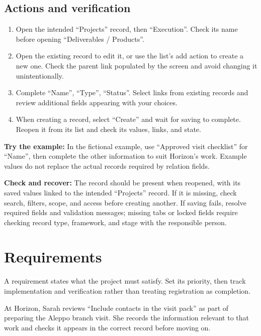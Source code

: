 \subsection{Actions and verification}
\begin{enumerate}
\item Open the intended “Projects” record, then “Execution”. Check its name before opening “Deliverables / Products”.
\item Open the existing record to edit it, or use the list's add action to create a new one. Check the parent link populated by the screen and avoid changing it unintentionally.
\item Complete “Name”, “Type”, “Status”. Select links from existing records and review additional fields appearing with your choices.
\item When creating a record, select “Create” and wait for saving to complete. Reopen it from its list and check its values, links, and state.
\end{enumerate}

\textbf{Try the example:} In the fictional example, use “Approved visit checklist” for “Name”, then complete the other information to suit Horizon's work. Example values do not replace the actual records required by relation fields.

\textbf{Check and recover:} The record should be present when reopened, with its saved values linked to the intended “Projects” record. If it is missing, check search, filters, scope, and access before creating another. If saving fails, resolve required fields and validation messages; missing tabs or locked fields require checking record type, framework, and stage with the responsible person.

\clearpage
\section{Requirements}
\label{sec:projects-feature-requirements}

A requirement states what the project must satisfy. Set its priority, then track implementation and verification rather than treating registration as completion.

\begin{rcnote}
At Horizon, Sarah reviews “Include contacts in the visit pack” as part of preparing the Aleppo branch visit. She records the information relevant to that work and checks it appears in the correct record before moving on.
\end{rcnote}

